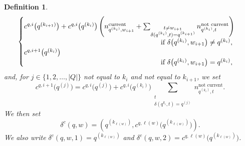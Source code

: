 \documentclass[12pt]{article}
\newtheorem{definition}{Definition}
\begin{document}
\begin{definition}
\begin{multline*}
\begin{cases}
 c^{q, i}\big( q^{(k_{i+1})} \big) + c^{q, i}\big( q^{(k_{i})} \big) \left( n^{\text{current}}_{q^{(k_i)}, w_{i+1}} 
 + \sum_{ \substack{ t \neq w_{i+1} \\ \delta(q^{(k_i)}, t) = q^{(k_{i+1})} } } n_{q^{(k_i)}, t}^{\text{not current}} \right) & \null \\ 
 \hspace{2.7in} \text{if $\delta\big( q^{(k_i)}, w_{i+1} \big) \neq q^{(k_i)} $}, & \null \\ 
 c^{q, i+1}\big( q^{(k_i)} \big) & \null \\ 
 \hspace{2.7in} \text{if $\delta\big( q^{(k_i)}, w_{i+1} \big) = q^{(k_i)} $}, & \null 
 \end{cases} 
\end{multline*}
 and, for $j \in \{ 1, 2, \ldots, |Q| \}$ not equal to $k_i$ and not equal to $k_{i+1}$, we set 
\begin{equation}\label{202506121177A77M1A}
 c^{q, i+1}\big( q^{(j)} \big) = c^{q, i}\big( q^{(j)} \big) 
 + c^{q, i}\big( q^{(k_{i})} \big) \sum_{\substack{t \\ \delta\left( q^{k_i}, t \right) 
 = q^{(j)} }} n_{q^{(k_i)}, t}^{\text{not current}}. 
\end{equation}
 We then set 
\begin{equation}\label{setdeltacqw}
 \delta^{c}( q, w ) 
 = \left( q^{( k_{\ell(w)} )}, 
 c^{q, \ell(w)}\big( q^{( k_{\ell(w)} )} \big) \right). 
\end{equation}
 We also write $ \delta^{c}( q, w, 1 ) = q^{( k_{\ell(w)} )}$ and 
 $ \delta^{c}( q, w, 2 ) = 
 c^{q, \ell(w)}\big( q^{( k_{\ell(w)} )} \big)$. 
\end{definition}
\end{document}
